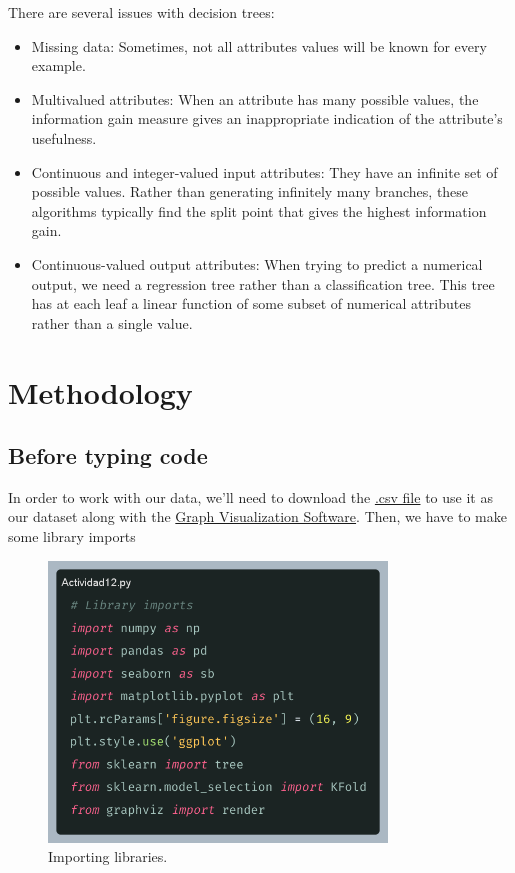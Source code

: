 \documentclass[10pt]{article}
\begin{document}
There are several issues with decision trees: 
\begin{itemize}
    \item Missing data: Sometimes, not all attributes values will be known for every example.
    \item Multivalued attributes: When an attribute has many possible values, the information gain measure gives an inappropriate indication of the attribute's usefulness.
    \item Continuous and integer-valued input attributes: They have an infinite set of possible values. Rather than generating infinitely many branches, these algorithms typically find the split point that gives the highest information gain.
    \item Continuous-valued output attributes: When trying to predict a numerical output, we need a regression tree rather than a classification tree. This tree has at each leaf a linear function of some subset of numerical attributes rather than a single value.
\end{itemize}

\newpage
\section{Methodology}
\subsection{Before typing code}
In order to work with our data, we'll need to download the \href{http://www.aprendemachinelearning.com/wp-content/uploads/2018/04/artists_billboard_fix3.csv}{.csv file} \cite{aprendeML} to use it as our dataset along with the \href{https://graphviz.org/download/}{Graph Visualization Software}. Then, we have to make some library imports
\begin{figure}[h]
    \centering
    \includegraphics[width=90mm]{2025-03-30-20-00-15.png}
    \caption{Importing libraries.}
\end{figure}
\end{document}
